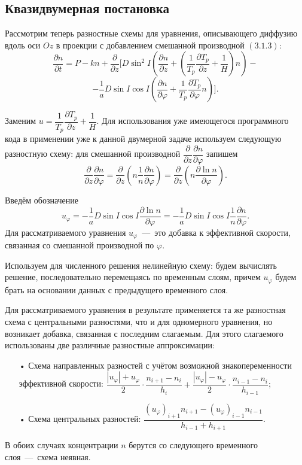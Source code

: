 \documentclass[14pt, a4paper, fleqn]{extarticle}
\begin{document}
\subsection{Квазидвумерная постановка}

Рассмотрим теперь разностные схемы для уравнения, описывающего диффузию вдоль оси $Oz$ в проекции с добавлением смешанной производной $(3.1.3)$:$$\dfrac{\partial n}{\partial t} =P-kn+\dfrac{\partial}{\partial z}\biggl[D\sin^2 I\left(\dfrac{\partial n}{\partial z}+\left(\dfrac{1}{T_p}\dfrac{\partial T_p}{\partial z}+\dfrac{1}{H}\right)n\right)-$$ $$-\dfrac{1}{a}D\sin I\cos I\left(\dfrac{\partial n}{\partial\varphi}+\dfrac{1}{T_p}\dfrac{\partial T_p}{\partial\varphi}n\right)\biggr].$$

Заменим $u = \dfrac{1}{T_p}\dfrac{\partial T_p}{\partial z}+\dfrac{1}{H}$. Для использования уже имеющегося программного кода в применении уже к данной двумерной задаче используем следующую разностную схему: для смешанной производной $\dfrac{\partial}{\partial z}\dfrac{\partial n}{\partial \varphi}$ запишем $$\dfrac{\partial}{\partial z}\dfrac{\partial n}{\partial \varphi}=\dfrac{\partial}{\partial z}\left(n\dfrac{1}{n}\dfrac{\partial n}{\partial \varphi}\right) = \dfrac{\partial}{\partial z}\left(n\dfrac{\partial \ln n}{\partial \varphi}\right).$$

Введём обозначение $$u_\varphi=-\dfrac{1}{a}D\sin I \cos I\dfrac{\partial \ln n}{\partial \varphi}=-\dfrac{1}{a}D\sin I \cos I\dfrac{1}{n}\dfrac{\partial n}{\partial \varphi}.$$ Для рассматриваемого уравнения $u_\varphi$~---~это добавка к эффективной скорости, связанная со смешанной производной по $\varphi$.

Используем для численного решения нелинейную схему: будем вычислять решение, последовательно перемещаясь по временным слоям, причем $u_\varphi$ будем брать на основании данных с предыдущего временного слоя.

Для рассматриваемого уравнения в результате применяется та же разностная схема с центральными разностями, что и для одномерного уравнения, но возникает добавка, связанная с последним слагаемым. Для этого слагаемого использованы две различные разностные аппроксимации:
\begin{itemize}
\item[•] Схема направленных разностей с учётом возможной знакопеременности эффективной скорости: $\dfrac{|u_\varphi|+u_\varphi}{2}\cdot\dfrac{n_{i+1}-n_i}{h_i} + \dfrac{|u_\varphi|-u_\varphi}{2}\cdot\dfrac{n_{i-1}-n_i}{h_{i-1}}$;
\item[•] Схема центральных разностей: $\dfrac{(u_\varphi)_{i+1}n_{i+1}-(u_\varphi)_{i-1}n_{i-1}}{h_{i-1}+h_{i+1}}$.
\end{itemize}
В обоих случаях концентрации $n$ берутся со следующего временного слоя~---~схема неявная.
\end{document}
